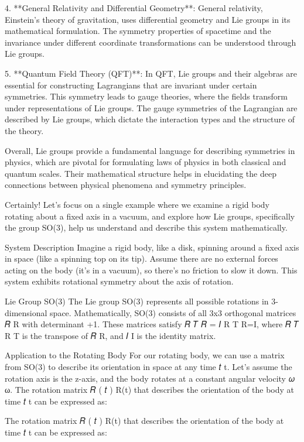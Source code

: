 \documentclass{article}
\begin{document}
4. **General Relativity and Differential Geometry**: General relativity, Einstein’s theory of gravitation, uses differential geometry and Lie groups in its mathematical formulation. The symmetry properties of spacetime and the invariance under different coordinate transformations can be understood through Lie groups.

5. **Quantum Field Theory (QFT)**: In QFT, Lie groups and their algebras are essential for constructing Lagrangians that are invariant under certain symmetries. This symmetry leads to gauge theories, where the fields transform under representations of Lie groups. The gauge symmetries of the Lagrangian are described by Lie groups, which dictate the interaction types and the structure of the theory.

Overall, Lie groups provide a fundamental language for describing symmetries in physics, which are pivotal for formulating laws of physics in both classical and quantum scales. Their mathematical structure helps in elucidating the deep connections between physical phenomena and symmetry principles.

Certainly! Let's focus on a single example where we examine a rigid body rotating about a fixed axis in a vacuum, and explore how Lie groups, specifically the group SO(3), help us understand and describe this system mathematically.

System Description
Imagine a rigid body, like a disk, spinning around a fixed axis in space (like a spinning top on its tip). Assume there are no external forces acting on the body (it's in a vacuum), so there's no friction to slow it down. This system exhibits rotational symmetry about the axis of rotation.

Lie Group SO(3)
The Lie group SO(3) represents all possible rotations in 3-dimensional space. Mathematically, SO(3) consists of all 3x3 orthogonal matrices 
𝑅
R with determinant +1. These matrices satisfy 
𝑅
𝑇
𝑅
=
𝐼
R 
T
 R=I, where 
𝑅
𝑇
R 
T
  is the transpose of 
𝑅
R, and 
𝐼
I is the identity matrix.

Application to the Rotating Body
For our rotating body, we can use a matrix from SO(3) to describe its orientation in space at any time 
𝑡
t. Let's assume the rotation axis is the z-axis, and the body rotates at a constant angular velocity 
𝜔
ω. The rotation matrix 
𝑅
(
𝑡
)
R(t) that describes the orientation of the body at time 
𝑡
t can be expressed as:

The rotation matrix 
𝑅
(
𝑡
)
R(t) that describes the orientation of the body at time 
𝑡
t can be expressed as:
\end{document}
